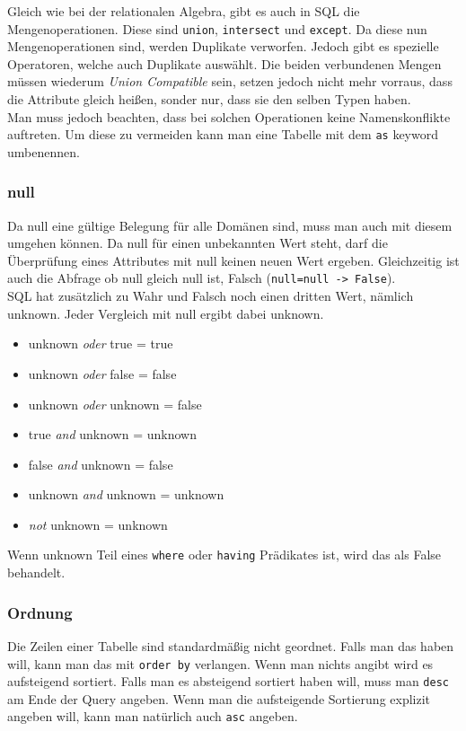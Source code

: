 \documentclass{article}
\begin{document}
 	Gleich wie bei der relationalen Algebra, gibt es auch in SQL die Mengenoperationen. Diese sind \verb|union|, \verb|intersect| und \verb|except|. Da diese nun Mengenoperationen sind, werden Duplikate verworfen. Jedoch gibt es spezielle Operatoren, welche auch Duplikate auswählt. Die beiden verbundenen Mengen müssen wiederum \textit{Union Compatible} sein, setzen jedoch nicht mehr vorraus, dass die Attribute gleich heißen, sonder nur, dass sie den selben Typen haben. \\
 	Man muss jedoch beachten, dass bei solchen Operationen keine Namenskonflikte auftreten. Um diese zu vermeiden kann man eine Tabelle mit dem \verb|as| keyword umbenennen.
 	\subsubsection{null}
 	Da null eine gültige Belegung für alle Domänen sind, muss man auch mit diesem umgehen können. Da null für einen unbekannten Wert steht, darf die Überprüfung eines Attributes mit null keinen neuen Wert ergeben. Gleichzeitig ist auch die Abfrage ob null gleich null ist, Falsch (\verb|null=null -> False|). \\
 	SQL hat zusätzlich zu Wahr und Falsch noch einen dritten Wert, nämlich unknown. Jeder Vergleich mit null ergibt dabei unknown.
 	\begin{itemize}
 		\item{unknown \textit{oder} true = true}
 		\item{unknown \textit{oder} false = false}
 		\item{unknown \textit{oder} unknown = false}
 	\end{itemize}
 	\begin{itemize}
 		\item{true \textit{and} unknown = unknown}
 		\item{false \textit{and} unknown = false}
 		\item{unknown \textit{and} unknown = unknown}
 	\end{itemize}
 	\begin{itemize}
 		\item{\textit{not} unknown = unknown}
 	\end{itemize}
 	Wenn unknown Teil eines \verb|where| oder \verb|having| Prädikates ist, wird das als False behandelt. \\
 	\subsubsection{Ordnung}
 	Die Zeilen einer Tabelle sind standardmäßig nicht geordnet. Falls man das haben will, kann man das mit \verb|order by| verlangen. Wenn man nichts angibt wird es aufsteigend sortiert. Falls man es absteigend sortiert haben will, muss man \verb|desc| am Ende der Query angeben. Wenn man die aufsteigende Sortierung explizit angeben will, kann man natürlich auch \verb|asc| angeben.
	  
\end{document}
